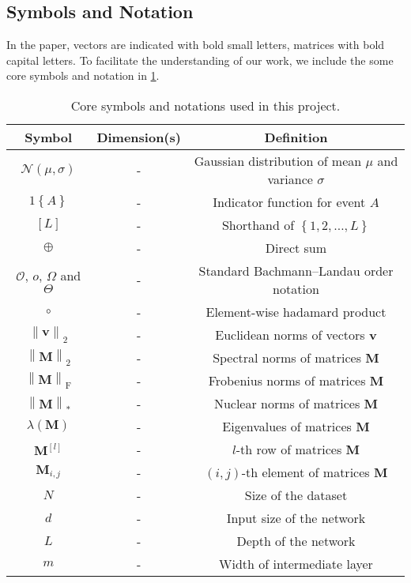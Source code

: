 \documentclass[nohyperref]{article}
\theoremstyle{plain}
\theoremstyle{definition}
\theoremstyle{remark}
\begin{document}
\subsection{Symbols and Notation}
\label{sec:symbols_and_notations}
In the paper, vectors are indicated with bold small letters, matrices with bold capital letters. To facilitate the understanding of our work, we include the some core symbols and notation in \cref{table:symbols_and_notations}. 

\begin{table}[ht]

\caption{Core symbols and notations used in this project.}
\label{table:symbols_and_notations}
\small
\centering
\begin{tabular}{c | c | c}
\toprule
Symbol & Dimension(s) & Definition \\
\midrule
$\mathcal{N}(\mu,\sigma) $ & - & Gaussian distribution of mean $\mu$ and variance $\sigma$ \\
$1\left \{A\right \}$ & - & Indicator function for event $A$\\
$[L]$ & - & Shorthand of $\left \{ 1,2,\dots ,L \right \}$\\
$\oplus$ & - & Direct sum\\
$\mathcal{O}$, $o$, $\Omega$ and $\Theta$ & - & Standard Bachmann–Landau order notation\\
$\circ$ & - & Element-wise hadamard product\\
\midrule
$\left \| \bm{v} \right \|_2$ & - & Euclidean norms of vectors $\bm{v}$ \\
$\left \| \bm{M} \right \|_2$ & - & Spectral norms of matrices $\bm{M}$ \\
$\left \| \bm{M} \right \|_{\mathrm{F}}$ & - & Frobenius norms of matrices $\bm{M}$ \\
$\left \| \bm{M} \right \|_{\mathrm{\ast}}$ & - & Nuclear norms of matrices $\bm{M}$ \\
$\lambda(\bm{M})$ & - & Eigenvalues of matrices $\bm{M}$ \\
$\bm{M}^{[l]}$ & - & $l$-th row of matrices $\bm{M}$\\
$\bm{M}_{i,j}$ & - & $(i, j)$-th element of matrices $\bm{M}$\\
\midrule
$N$ & - & Size of the dataset \\
$d$ & - & Input size of the network \\
$L$ & - & Depth of the network \\
$m$ & - & Width of intermediate layer\\

\end{tabular}
\end{table}
\end{document}
